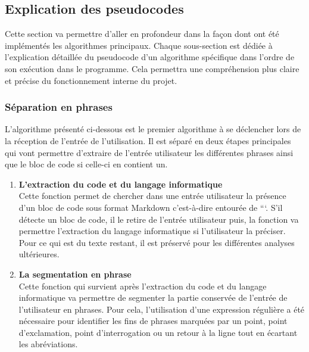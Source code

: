 \documentclass{rapport}
\begin{document}
\newpage
\subsection{Explication des pseudocodes}
Cette section va permettre d'aller en profondeur dans la façon dont ont été implémentés les algorithmes principaux. Chaque sous-section est dédiée à l'explication détaillée du pseudocode d'un algorithme spécifique dans l'ordre de son exécution dans le programme. Cela permettra une compréhension plus claire et précise du fonctionnement interne du projet.

\subsubsection{Séparation en phrases}
L'algorithme présenté ci-dessous est le premier algorithme à se déclencher lors de la réception de l'entrée de l'utilisation. Il est séparé en deux étapes principales qui vont permettre d'extraire de l'entrée utilisateur les différentes phrases ainsi que le bloc de code si celle-ci en contient un.
\begin{enumerate}
    \item \textbf{L'extraction du code et du langage informatique}\\
    Cette fonction permet de chercher dans une entrée utilisateur la présence d'un bloc de code sous format Markdown c'est-à-dire entourée de ```. S'il détecte un bloc de code, il le retire de l'entrée utilisateur puis, la fonction va permettre l'extraction du langage informatique si l'utilisateur la préciser. Pour ce qui est du texte restant, il est préservé pour les différentes analyses ultérieures. 
    \item \textbf{La segmentation en phrase}\\
    Cette fonction qui survient après l'extraction du code et du langage informatique va permettre de segmenter la partie conservée de l'entrée de l'utilisateur en phrases. Pour cela, l'utilisation d'une expression régulière a été nécessaire pour identifier les fins de phrases marquées par un point, point d'exclamation, point d'interrogation ou un retour à la ligne tout en écartant les abréviations.
\end{enumerate}
\end{document}
